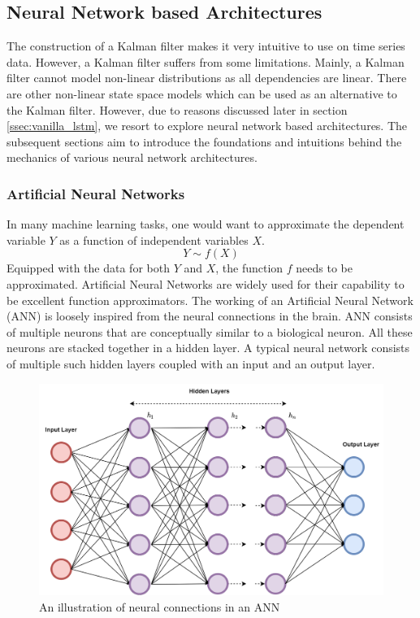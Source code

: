 \documentclass{article}
\begin{document}
\subsection{Neural Network based Architectures}
The construction of a Kalman filter makes it very intuitive to use on time series data. However, a Kalman filter suffers from some limitations. Mainly, a Kalman filter cannot model non-linear distributions as all dependencies are linear. There are other non-linear state space models which can be used as an alternative to the Kalman filter. However, due to reasons discussed later in section \ref{ssec:vanilla_lstm}, we resort to explore neural network based architectures. The subsequent sections aim to introduce the foundations and intuitions behind the mechanics of various neural network architectures.  

\subsubsection{Artificial Neural Networks}
In many machine learning tasks, one would want to approximate the dependent variable $Y$ as a function of independent variables $X$.
$$Y\sim f(X)$$
Equipped with the data for both $Y$ and $X$, the function $f$ needs to be approximated. Artificial Neural Networks are widely used for their capability to be excellent function approximators. The working of an Artificial Neural Network (ANN) is loosely inspired from the neural connections in the brain. ANN consists of multiple neurons that are conceptually similar to a biological neuron. All these neurons are stacked together in a hidden layer. A typical neural network consists of multiple such hidden layers coupled with an input and an output layer. 

\begin{figure}[H]
\centering
\includegraphics[scale=0.2]{theory/ann.png}
\caption{An illustration of neural connections in an ANN}
\label{fig:ann}
\end{figure}
\end{document}
